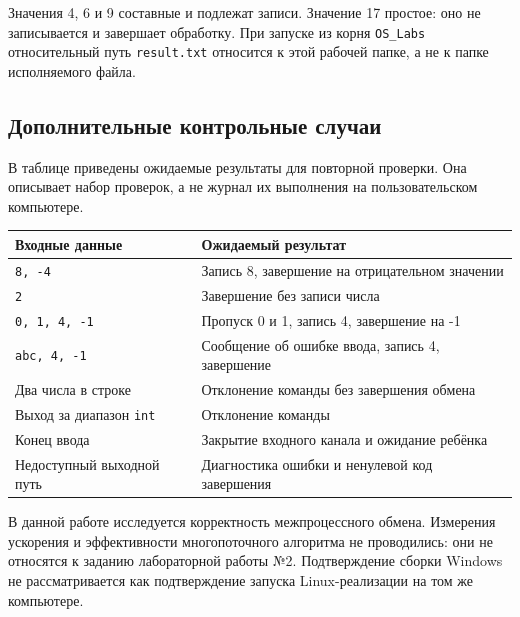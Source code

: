 Значения 4, 6 и 9 составные и подлежат записи. Значение 17 простое: оно не записывается и завершает обработку. При запуске из корня \texttt{OS\_Labs} относительный путь \texttt{result.txt} относится к этой рабочей папке, а не к папке исполняемого файла.

\subsection{Дополнительные контрольные случаи}
В таблице приведены ожидаемые результаты для повторной проверки. Она описывает набор проверок, а не журнал их выполнения на пользовательском компьютере.

\begin{center}
\begin{tabular}{p{}p{}}
Входные данные & Ожидаемый результат \\
\hline
\texttt{8, -4} & Запись 8, завершение на отрицательном значении \\
\texttt{2} & Завершение без записи числа \\
\texttt{0, 1, 4, -1} & Пропуск 0 и 1, запись 4, завершение на -1 \\
\texttt{abc, 4, -1} & Сообщение об ошибке ввода, запись 4, завершение \\
Два числа в строке & Отклонение команды без завершения обмена \\
Выход за диапазон \texttt{int} & Отклонение команды \\
Конец ввода & Закрытие входного канала и ожидание ребёнка \\
Недоступный выходной путь & Диагностика ошибки и ненулевой код завершения \\
\end{tabular}
\end{center}

В данной работе исследуется корректность межпроцессного обмена. Измерения ускорения и эффективности многопоточного алгоритма не проводились: они не относятся к заданию лабораторной работы №2. Подтверждение сборки Windows не рассматривается как подтверждение запуска Linux-реализации на том же компьютере.
